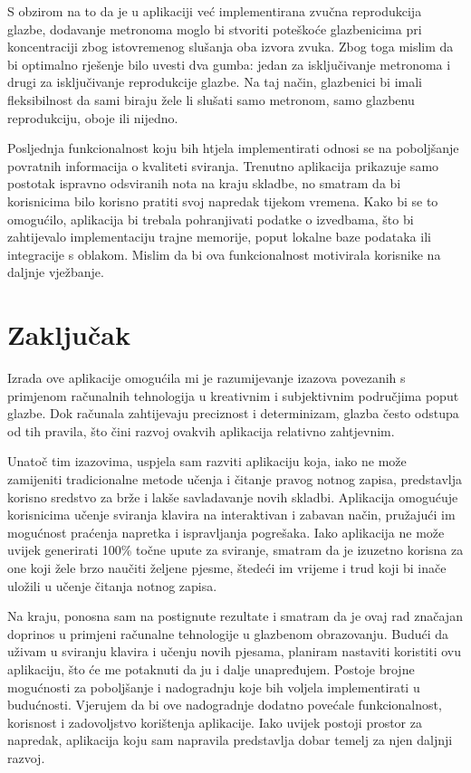 \documentclass[diplomskirad, upload]{fer}
\begin{document}
S obzirom na to da je u aplikaciji već implementirana zvučna reprodukcija glazbe, dodavanje metronoma moglo bi stvoriti poteškoće glazbenicima pri koncentraciji zbog istovremenog slušanja oba izvora zvuka. Zbog toga mislim da bi optimalno rješenje bilo uvesti dva gumba: jedan za isključivanje metronoma i drugi za isključivanje reprodukcije glazbe. Na taj način, glazbenici bi imali fleksibilnost da sami biraju žele li slušati samo metronom, samo glazbenu reprodukciju, oboje ili nijedno.

Posljednja funkcionalnost koju bih htjela implementirati odnosi se na poboljšanje povratnih informacija o kvaliteti sviranja. Trenutno aplikacija prikazuje samo postotak ispravno odsviranih nota na kraju skladbe, no smatram da bi korisnicima bilo korisno pratiti svoj napredak tijekom vremena. Kako bi se to omogućilo, aplikacija bi trebala pohranjivati podatke o izvedbama, što bi zahtijevalo implementaciju trajne memorije, poput lokalne baze podataka ili integracije s oblakom. Mislim da bi ova funkcionalnost motivirala korisnike na daljnje vježbanje.



\chapter{Zaključak}
Izrada ove aplikacije omogućila mi je razumijevanje izazova povezanih s primjenom računalnih tehnologija u kreativnim i subjektivnim područjima poput glazbe. Dok računala zahtijevaju preciznost i determinizam, glazba često odstupa od tih pravila, što čini razvoj ovakvih aplikacija relativno zahtjevnim.

Unatoč tim izazovima, uspjela sam razviti aplikaciju koja, iako ne može zamijeniti tradicionalne metode učenja i čitanje pravog notnog zapisa, predstavlja korisno sredstvo za brže i lakše savladavanje novih skladbi. Aplikacija omogućuje korisnicima učenje sviranja klavira na interaktivan i zabavan način, pružajući im mogućnost praćenja napretka i ispravljanja pogrešaka. Iako aplikacija ne može uvijek generirati 100\% točne upute za sviranje, smatram da je izuzetno korisna za one koji žele brzo naučiti željene pjesme, štedeći im vrijeme i trud koji bi inače uložili u učenje čitanja notnog zapisa.

Na kraju, ponosna sam na postignute rezultate i smatram da je ovaj rad značajan doprinos u primjeni računalne tehnologije u glazbenom obrazovanju. Budući da uživam u sviranju klavira i učenju novih pjesama, planiram nastaviti koristiti ovu aplikaciju, što će me potaknuti da ju i dalje unapređujem. Postoje brojne mogućnosti za poboljšanje i nadogradnju koje bih voljela implementirati u budućnosti. Vjerujem da bi ove nadogradnje dodatno povećale funkcionalnost, korisnost i zadovoljstvo korištenja aplikacije. Iako uvijek postoji prostor za napredak, aplikacija koju sam napravila predstavlja dobar temelj za njen daljnji razvoj.
\end{document}
